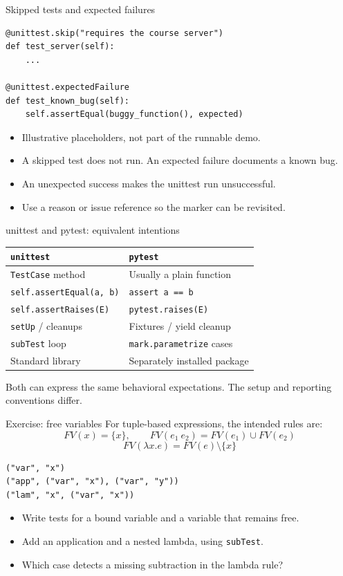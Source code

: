 \documentclass[aspectratio=169,11pt]{beamer}
\newcommand{\code}[1]{\texttt{#1}}
\begin{document}
\begin{frame}[fragile]{Skipped tests and expected failures}
\begin{lstlisting}
@unittest.skip("requires the course server")
def test_server(self):
    ...

@unittest.expectedFailure
def test_known_bug(self):
    self.assertEqual(buggy_function(), expected)
\end{lstlisting}
\begin{itemize}
\item Illustrative placeholders, not part of the runnable demo.
\item A skipped test does not run. An expected failure documents a known bug.
\item An unexpected success makes the unittest run unsuccessful.
\item Use a reason or issue reference so the marker can be revisited.
\end{itemize}
\end{frame}

\begin{frame}[fragile]{unittest and pytest: equivalent intentions}
\renewcommand{\arraystretch}{1.55}
\begin{tabular}{p{}p{}}
\toprule
\code{unittest} & \code{pytest} \\
\midrule
\code{TestCase} method & Usually a plain function \\
\code{self.assertEqual(a, b)} & \code{assert a == b} \\
\code{self.assertRaises(E)} & \code{pytest.raises(E)} \\
\code{setUp} / cleanups & Fixtures / yield cleanup \\
\code{subTest} loop & \code{mark.parametrize} cases \\
Standard library & Separately installed package \\
\bottomrule
\end{tabular}
\medskip

Both can express the same behavioral expectations. The setup and
reporting conventions differ.
\end{frame}

\begin{frame}[fragile]{Exercise: free variables}
For tuple-based expressions, the intended rules are:
\[
FV(x)=\{x\},\qquad FV(e_1\ e_2)=FV(e_1)\cup FV(e_2)
\]
\[
FV(\lambda x.e)=FV(e)\setminus\{x\}
\]
\begin{lstlisting}
("var", "x")
("app", ("var", "x"), ("var", "y"))
("lam", "x", ("var", "x"))
\end{lstlisting}
\begin{itemize}
\item Write tests for a bound variable and a variable that remains free.
\item Add an application and a nested lambda, using \code{subTest}.
\item Which case detects a missing subtraction in the lambda rule?
\end{itemize}
\end{frame}
\end{document}
